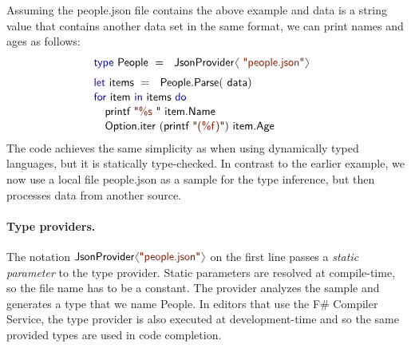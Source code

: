 \documentclass[preprint]{sigplanconf}
\newcommand{\langl}{\begin{picture}(4.5,7)
\put(1.1,2.5){\rotatebox{60}{\line(1,0){5.5}}}
\put(1.1,2.5){\rotatebox{300}{\line(1,0){5.5}}}
\end{picture}}
\newcommand{\rangl}{\begin{picture}(4.5,7)
\put(.9,2.5){\rotatebox{120}{\line(1,0){5.5}}}
\put(.9,2.5){\rotatebox{240}{\line(1,0){5.5}}}
\end{picture}}
\newcommand{\kvd}[1]{\textnormal{\textcolor{kvdclr}{\sffamily #1}}}
\newcommand{\str}[1]{\textnormal{\textcolor{strclr}{\sffamily "#1"}}}
\newcommand{\strf}[1]{\textnormal{\textcolor{strclr}{\sffamily #1}}}
\newcommand{\ident}[1]{\textnormal{\sffamily #1}}
\begin{document}
Assuming the \strf{people.json} file contains the above example and \ident{data} is a string value
that contains another data set in the same format, we can print names and ages as follows:
%
\begin{equation*}
\begin{array}{l}
 \kvd{type}~\ident{People}~=~\ident{JsonProvider}\langl\str{people.json}\rangl\hspace{1em} \\[0.6em]
 \kvd{let}~\ident{items}~=~\ident{People.Parse}(\ident{data})\\[0.1em]
 \kvd{for}~\ident{item}~\kvd{in}~\ident{items}~\kvd{do}\\[0.1em]
 \quad\ident{printf}~\str{\%s }~\ident{item.Name}\\[0.1em]
 \quad\ident{Option.iter}~(\ident{printf}~\str{(\%f)})~\ident{item.Age}
\end{array}
\end{equation*}
%
The code achieves the same simplicity as when using dynamically typed languages, but it is statically 
type-checked. In contrast to the earlier example, we now use a local file \strf{people.json} as a 
sample for the type inference, but then processes data from another source. 

\paragraph{Type providers.}
The notation $\ident{JsonProvider}\langl\str{people.json}\rangl$ on the first line passes a 
\emph{static parameter} to the type provider. Static parameters are resolved at compile-time, 
so the file name has to be a constant. The provider analyzes the sample and generates
a type that we name \ident{People}. In editors that use the F\# Compiler Service, the 
type provider is also executed at development-time and so the same provided types are
used in code completion.
\end{document}
